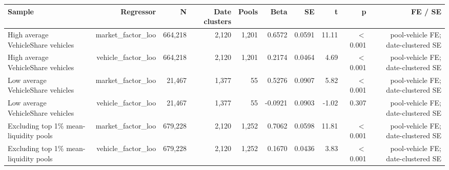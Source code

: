 \begin{tabular}{lrrrrrrrrr}
\toprule
Sample & Regressor & N & Date clusters & Pools & Beta & SE & t & p & FE / SE \\
\midrule
High average VehicleShare vehicles & market\_factor\_loo & 664,218 & 2,120 & 1,201 & 0.6572 & 0.0591 & 11.11 & \ensuremath{<}0.001 & pool-vehicle FE; date-clustered SE \\
High average VehicleShare vehicles & vehicle\_factor\_loo & 664,218 & 2,120 & 1,201 & 0.2174 & 0.0464 & 4.69 & \ensuremath{<}0.001 & pool-vehicle FE; date-clustered SE \\
Low average VehicleShare vehicles & market\_factor\_loo & 21,467 & 1,377 & 55 & 0.5276 & 0.0907 & 5.82 & \ensuremath{<}0.001 & pool-vehicle FE; date-clustered SE \\
Low average VehicleShare vehicles & vehicle\_factor\_loo & 21,467 & 1,377 & 55 & -0.0921 & 0.0903 & -1.02 & 0.307 & pool-vehicle FE; date-clustered SE \\
Excluding top 1\% mean-liquidity pools & market\_factor\_loo & 679,228 & 2,120 & 1,252 & 0.7062 & 0.0598 & 11.81 & \ensuremath{<}0.001 & pool-vehicle FE; date-clustered SE \\
Excluding top 1\% mean-liquidity pools & vehicle\_factor\_loo & 679,228 & 2,120 & 1,252 & 0.1670 & 0.0436 & 3.83 & \ensuremath{<}0.001 & pool-vehicle FE; date-clustered SE \\
\bottomrule
\end{tabular}
